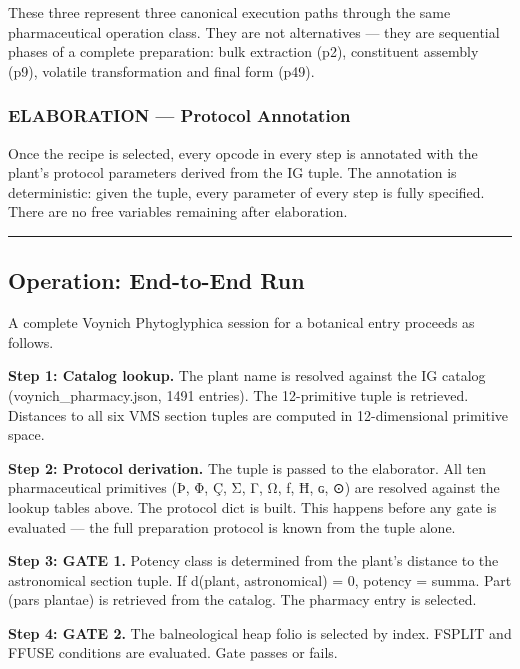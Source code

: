 These three represent three canonical execution paths through the same
pharmaceutical operation class. They are not alternatives --- they are
sequential phases of a complete preparation: bulk extraction (p2),
constituent assembly (p9), volatile transformation and final form (p49).

\hypertarget{elaboration-protocol-annotation}{%
\subsubsection{ELABORATION --- Protocol
Annotation}\label{elaboration-protocol-annotation}}

Once the recipe is selected, every opcode in every step is annotated
with the plant's protocol parameters derived from the IG tuple. The
annotation is deterministic: given the tuple, every parameter of every
step is fully specified. There are no free variables remaining after
elaboration.

\begin{center}\rule{0.5\linewidth}{0.5pt}\end{center}

\hypertarget{operation-end-to-end-run}{%
\subsection{Operation: End-to-End Run}\label{operation-end-to-end-run}}

A complete Voynich Phytoglyphica session for a botanical entry proceeds
as follows.

\textbf{Step 1: Catalog lookup.} The plant name is resolved against the
IG catalog (voynich\_pharmacy.json, 1491 entries). The 12-primitive
tuple is retrieved. Distances to all six VMS section tuples are computed
in 12-dimensional primitive space.

\textbf{Step 2: Protocol derivation.} The tuple is passed to the
elaborator. All ten pharmaceutical primitives (Þ, Φ, Ç, Σ, Γ, Ω, ƒ, Ħ,
ɢ, ⊙) are resolved against the lookup tables above. The protocol dict is
built. This happens before any gate is evaluated --- the full
preparation protocol is known from the tuple alone.

\textbf{Step 3: GATE 1.} Potency class is determined from the plant's
distance to the astronomical section tuple. If d(plant, astronomical) =
0, potency = summa. Part (pars plantae) is retrieved from the catalog.
The pharmacy entry is selected.

\textbf{Step 4: GATE 2.} The balneological heap folio is selected by
index. FSPLIT and FFUSE conditions are evaluated. Gate passes or fails.

